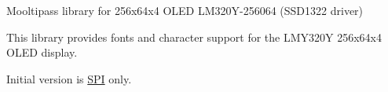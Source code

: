 Mooltipass library for 256x64x4 O\-L\-E\-D L\-M320\-Y-\/256064 (S\-S\-D1322 driver)

This library provides fonts and character support for the L\-M\-Y320\-Y 256x64x4 O\-L\-E\-D display.

Initial version is \hyperlink{class_s_p_i}{S\-P\-I} only. 